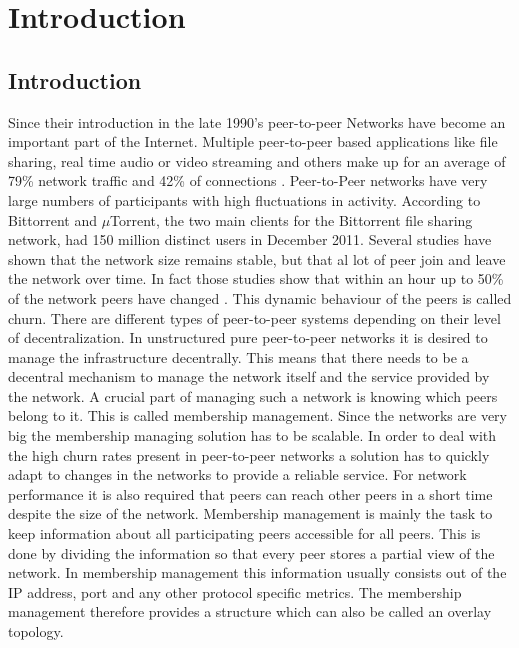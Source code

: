 \chapter{Introduction} 
\label{chap:introduction}

\section{Introduction}
Since their introduction in the late 1990's peer-to-peer Networks have become an
important part of the Internet. Multiple peer-to-peer based applications like
file sharing, real time audio or video streaming and others make up for an average of
79\% network traffic and 42\% of connections \cite{John+:InetTraffic}.
Peer-to-Peer networks have very large numbers of participants with high
fluctuations in activity. According to \cite{bittorrent} Bittorrent and
$\mu$Torrent, the two main clients for the Bittorrent file sharing network, had
150 million distinct users in December 2011. Several studies have shown that the network size remains stable,
but that al lot of peer join and leave the network over time. In fact those
studies show that within an hour up to 50\% of the network peers have
changed\cite{stutzbach2006understanding} \cite{falkner2007profiling}. This
dynamic behaviour of the peers is called churn. There are different types of
peer-to-peer systems depending on their level of decentralization. In
unstructured pure peer-to-peer networks it is desired to manage the
infrastructure decentrally. This means that there needs to be a
decentral mechanism to manage the network itself and the service provided by
the network. A crucial part of managing such a network is knowing which peers belong
to it. This is called membership management. Since the networks are very big the
membership managing solution has to be scalable. In order to deal with the high
churn rates present in peer-to-peer networks a solution has to quickly adapt to
changes in the networks to provide a reliable service. For network performance
it is also required that peers can reach other peers in a short time despite
the size of the network. Membership management is mainly the task to keep
information about all participating peers accessible for all peers. This is
done by dividing the information so that every peer stores a partial view of
the network. In membership management this information usually consists out of
the IP address, port and any other protocol specific metrics. The membership
management therefore provides a structure which can also be called an overlay
topology.


